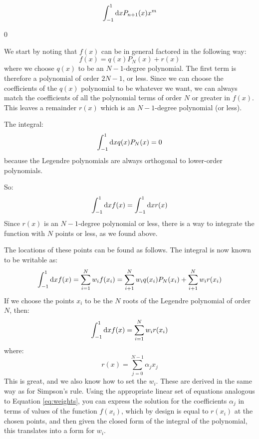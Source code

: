   
  \begin{equation}
    \int_{-1}^{1} {\rm d}x P_{n+1}(x) x^m 
  \end{equation}
  
  \begin{answer}
    0
  \end{answer}

We start by noting that $f(x)$  can be in general factored in the
following way:
\begin{equation}
f(x) = q(x) P_N(x) + r(x)
\end{equation}
where we choose $q(x)$ to be an $N-1$-degree polynomial. The first
term is therefore a polynomial of order $2N-1$, or less. Since we can
choose the coefficients of the $q(x)$ polynomial to be whatever we
want, we can always match the coefficients of all the polynomial terms
of order $N$ or greater in $f(x)$. This leaves a remainder $r(x)$
which is an $N-1$-degree polynomial (or less).

The integral:
\begin{equation}
\int_{-1}^{1} {\rm d}x q(x) P_N(x) = 0
\end{equation}
because the Legendre polynomials are always orthogonal to lower-order
polynomials.

So:
\begin{equation}
\int_{-1}^{1} {\rm d}x f(x) = \int_{-1}^{1} {\rm d}x r(x)
\end{equation}
Since $r(x)$ is an $N-1$-degree polynomial or less, there is a way to
integrate the function with $N$ points or less, as we found above.

The locations of these points can be found as follows. The integral is
now known to be writable as:
\begin{equation}
\int_{-1}^{1} {\rm d}x f(x) = \sum_{i=1}^{N} w_i f(x_i) =
\sum_{i+1}^{N} w_i q(x_i) P_N(x_i) + 
\sum_{i+1}^{N} w_i r(x_i)
\end{equation}
If we choose the points $x_i$ to be the $N$ roots of the Legendre
polynomial of order $N$, then:
\begin{equation}
\int_{-1}^{1} {\rm d}x f(x) = \sum_{i=1}^{N} w_i r(x_i)
\end{equation}
where:
\begin{equation}
r(x) = \sum_{j=0}^{N-1} \alpha_j x_j
\end{equation}
This is great, and we also know how to set the $w_i$. These are
derived in the same way as for Simpson's rule.  Using the appropriate
linear set of equations analogous to Equation \ref{eq:weights}, you
can express the solution for the coefficients $\alpha_j$ in terms of
values of the function $f(x_i)$, which by design is equal to $r(x_i)$
at the chosen points, and then given the closed form of the integral
of the polynomial, this translates into a form for $w_i$.

